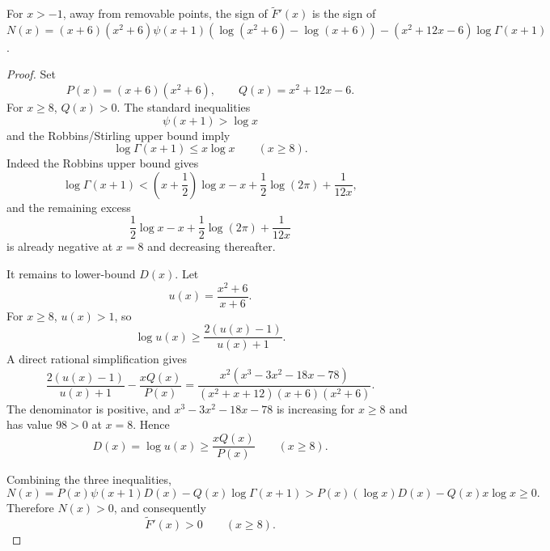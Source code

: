 \begin{lemma}
\label{res:bz-gamma-quotient-derivative-normal-form}
For \(x>-1\), away from removable points, the sign of \(\widetilde F'(x)\) is the sign of \(N(x)=(x+6)(x^2+6)\psi(x+1)(\log(x^2+6)-\log(x+6))-(x^2+12x-6)\log\Gamma(x+1)\).
\end{lemma}
\begin{proof}
Set
\[
P(x)=(x+6)(x^2+6),\qquad Q(x)=x^2+12x-6.
\]
For \(x\ge8\), \(Q(x)>0\). The standard inequalities
\[
\psi(x+1)>\log x
\]
and the Robbins/Stirling upper bound imply
\[
\log\Gamma(x+1)\le x\log x
\qquad (x\ge8).
\]
Indeed the Robbins upper bound gives
\[
\log\Gamma(x+1)
<
\left(x+\frac12\right)\log x-x+\frac12\log(2\pi)+\frac1{12x},
\]
and the remaining excess
\[
\frac12\log x-x+\frac12\log(2\pi)+\frac1{12x}
\]
is already negative at \(x=8\) and decreasing thereafter.

It remains to lower-bound \(D(x)\). Let
\[
u(x)=\frac{x^2+6}{x+6}.
\]
For \(x\ge8\), \(u(x)>1\), so
\[
\log u(x)\ge \frac{2(u(x)-1)}{u(x)+1}.
\]
A direct rational simplification gives
\[
\frac{2(u(x)-1)}{u(x)+1}
-\frac{xQ(x)}{P(x)}
=
\frac{x^2(x^3-3x^2-18x-78)}
{(x^2+x+12)(x+6)(x^2+6)}.
\]
The denominator is positive, and \(x^3-3x^2-18x-78\) is increasing for \(x\ge8\) and has value \(98>0\) at \(x=8\). Hence
\[
D(x)=\log u(x)\ge \frac{xQ(x)}{P(x)}
\qquad (x\ge8).
\]

Combining the three inequalities,
\[
N(x)
=P(x)\psi(x+1)D(x)-Q(x)\log\Gamma(x+1)
>
P(x)(\log x)D(x)-Q(x)x\log x
\ge0.
\]
Therefore \(N(x)>0\), and consequently
\[
\widetilde F'(x)>0
\qquad (x\ge8).
\]
\end{proof}

